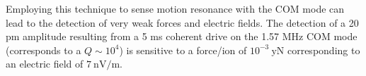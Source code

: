 \documentclass[aps,prl,superscriptaddress,floatfix]{revtex4-1}
\begin{document}
Employing this technique to sense motion resonance with the COM mode
can lead to the detection of very weak forces and electric fields.
The detection of a 20 pm amplitude resulting from a 5 ms coherent
drive on the 1.57 MHz COM mode (corresponds to a $Q\sim10^{4}$) is
sensitive to a force/ion of $10^{-3}\:\mathrm{yN}$ corresponding
to an electric field of $7\:\mathrm{nV/m}$.



\end{document}
